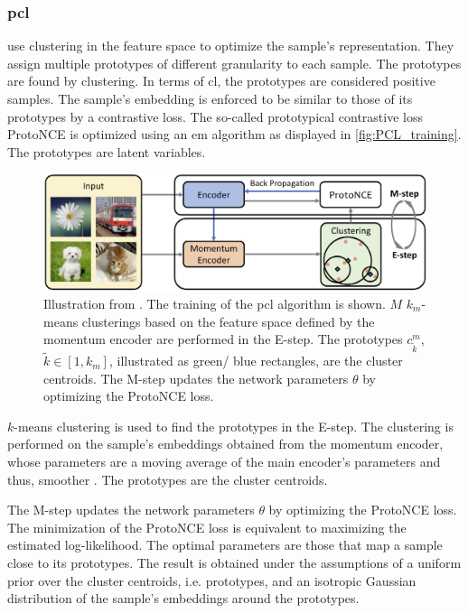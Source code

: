 \subsubsection{\acl{pcl}}\label{subsec:PCL}

\citet{PCL_2021} use clustering in the feature space to optimize the sample's representation.
They assign multiple prototypes of different granularity to each sample.
The prototypes are found by clustering.
In terms of \ac{cl}, the prototypes are considered positive samples.
The sample's embedding is enforced to be similar to those of its prototypes by a contrastive loss.
The so-called prototypical contrastive loss ProtoNCE is optimized using an \ac{em} algorithm 
as displayed in \autoref{fig:PCL_training}.
The prototypes are latent variables.

\begin{figure}[h] %
    \centering
    \includegraphics[width=360pt]{images/PCL_training.png}
    \caption{Illustration from \citet{PCL_2021}.
    The training of the \ac{pcl} algorithm is shown.
    $M$ $k_m$-means clusterings based on the feature space defined by the momentum encoder 
    are performed in the E-step.
    The prototypes $c^m_{\tilde{k}}$, $\tilde{k} \in [1, k_m]$, illustrated as green/ blue rectangles, 
    are the cluster centroids.
    The M-step updates the network parameters $\theta$ by optimizing the ProtoNCE loss.
    }
    \label{fig:PCL_training}
\end{figure}

$k$-means clustering is used to find the prototypes in the E-step.
The clustering is performed on the sample's embeddings obtained from the momentum encoder, 
whose parameters are a moving average of the main encoder's parameters and thus, smoother \citet{PCL_2021}.
The prototypes are the cluster centroids.

The M-step updates the network parameters $\theta$ by optimizing the ProtoNCE loss.
The minimization of the ProtoNCE loss is equivalent to maximizing the estimated log-likelihood.
The optimal parameters are those that map a sample close to its prototypes.
The result is obtained under the assumptions of a uniform prior over the cluster centroids, i.e. prototypes,
and an isotropic Gaussian distribution of the sample's embeddings around the prototypes.

